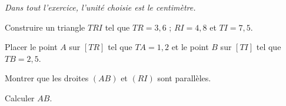 \emph{Dans tout l'exercice, l'unité choisie est le centimètre.}
\begin{myenumerate}
\item Construire un triangle $TRI$ tel que $TR = 3,6$  ; $RI= 4,8$ et $TI= 7,5$.
\item Placer le point $A$ sur $[TR]$ tel que $TA=1,2$ et le point $B$ sur $[TI]$ tel que $TB=2,5$.
\item Montrer que les droites $(AB)$ et $(RI)$ sont parallèles.
\item Calculer $AB$.
\end{myenumerate}